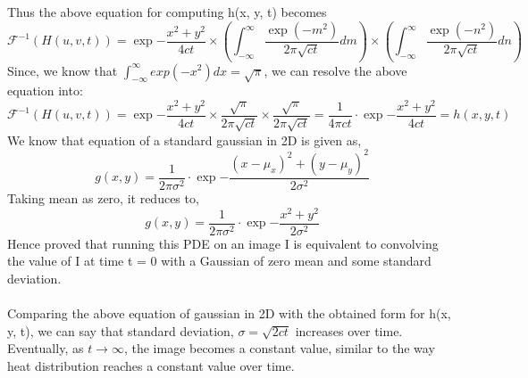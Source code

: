 \documentclass{article}
\begin{document}
\begin{enumerate}
Thus the above equation for computing h(x, y, t) becomes
\[
    \mathcal{F}^{-1}(H(u, v, t)) = \exp{-\frac{x^2 + y^2}{4ct}} \times \left( \int_{-\infty}^{\infty} 
    \frac{\exp(-m^2)}{2 \pi \sqrt{ct}} dm \right) \times \left( \int_{-\infty}^{\infty} 
    \frac{\exp(-n^2)}{2 \pi \sqrt{ct}} dn \right)
\]
Since, we know that $\int_{-\infty}^{\infty}exp(-x^2) dx = \sqrt{\pi}$, we can resolve the above equation into:
\[
    \mathcal{F}^{-1}(H(u, v, t)) = \exp{-\frac{x^2 + y^2}{4ct}} \times \frac{\sqrt{\pi}}{2 \pi \sqrt{ct}} \times \frac{\sqrt{\pi}}{2 \pi \sqrt{ct}} = \frac{1}{4 \pi ct}\cdot\exp{-\frac{x^2 + y^2}{4ct}} = h(x, y, t)
\]
We know that equation of a standard gaussian in 2D is given as,
\[
    g(x, y) = \frac{1}{2\pi\sigma^2} \cdot \exp{-\frac{(x - \mu_x)^2 + (y - \mu_y)^2}{2\sigma^2}}
\]
Taking mean as zero, it reduces to,
\[
    g(x, y) = \frac{1}{2\pi\sigma^2} \cdot \exp{-\frac{x^2 + y^2}{2\sigma^2}}
\]
Hence proved that running this PDE on an image I is equivalent to convolving the value of I at time t = 0 with a Gaussian of zero mean and some standard deviation. \\ \\ 

Comparing the above equation of gaussian in 2D with the obtained form for h(x, y, t), we can say that standard deviation, $\sigma = \sqrt{2ct}$ increases over time. Eventually, as $t \to \infty$, the image becomes a constant value, similar to the way heat distribution reaches a constant value over time.

\end{enumerate}
\end{document}
